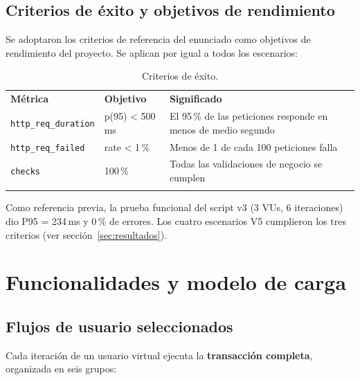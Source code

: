 \documentclass[11pt]{article}
\newcommand{\encab}[1]{{\leavevmode\color{white}\sffamily\bfseries #1}}
\renewcommand{\toprule}{\arrayrulecolor{ucbazul}\specialrule{0.8pt}{0pt}{0pt}\arrayrulecolor{black}}
\renewcommand{\midrule}{\arrayrulecolor{ucbazul}\specialrule{0.4pt}{0pt}{0pt}\arrayrulecolor{black}}
\renewcommand{\bottomrule}{\arrayrulecolor{acento}\specialrule{1.2pt}{0pt}{0pt}\arrayrulecolor{black}}
\begin{document}
\subsection{Criterios de éxito y objetivos de rendimiento}

Se adoptaron los criterios de referencia del enunciado como objetivos de
rendimiento del proyecto. Se aplican por igual a todos los escenarios:

\begin{table}[H]
\centering
\caption{Criterios de éxito.}
\begin{tabularx}{\textwidth}{l l >{\raggedright\arraybackslash}X}
\toprule
\rowcolor{ucbazul}
\encab{Métrica} & \encab{Objetivo} & \encab{Significado} \\
\midrule
\texttt{http\_req\_duration} & p(95) < 500\,ms & El 95\,\% de las peticiones responde en menos de medio segundo \\
\texttt{http\_req\_failed}   & rate < 1\,\%     & Menos de 1 de cada 100 peticiones falla \\
\texttt{checks}              & 100\,\%          & Todas las validaciones de negocio se cumplen \\
\bottomrule
\end{tabularx}
\end{table}

Como referencia previa, la prueba funcional del script v3 (3 VUs, 6 iteraciones)
dio P95 = 234\,ms y 0\,\% de errores. Los cuatro escenarios V5 cumplieron los tres
criterios (ver sección~\ref{sec:resultados}).

\section{Funcionalidades y modelo de carga}

\subsection{Flujos de usuario seleccionados}

Cada iteración de un usuario virtual ejecuta la \textbf{transacción completa},
organizada en seis grupos:
\end{document}
